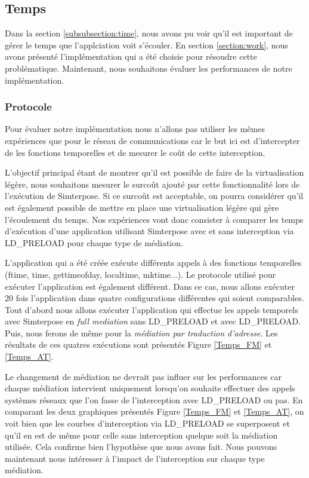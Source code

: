 \subsection{Temps}
\label{section:temps}
Dans la section \ref{subsubsection:time}, nous avons pu voir qu'il est important de gérer le temps que l'applciation voit s'écouler. En section \ref{section:work}, nous avons présenté l'implémentation qui a été choisie pour résoudre cette problématique. Maintenant, nous souhaitons évaluer les performances de notre implémentation.

\subsubsection{Protocole}
Pour évaluer notre implémentation nous n'allons pas utiliser les mêmes expériences que pour le réseau de communications car le but ici est d'intercepter de les fonctions temporelles et de mesurer le coût de cette interception.

L'objectif principal étant de montrer qu'il est possible de faire de la virtualisation légère, nous souhaitons mesurer le surcoût ajouté par cette fonctionnalité lors de l'exécution de Simterpose. Si ce surcoût est acceptable, on pourra considérer qu'il est également possible de mettre en place une virtualisation légère qui gère l'écoulement du temps. Nos expériences vont donc consister à comparer les temps d'exécution d'une application utilisant Simterpose avec et sans interception via LD\_PRELOAD pour chaque type de médiation.

L'application qui a été créée exécute différents appels à des fonctions temporelles (ftime, time, gettimeofday, localtime, mktime...). Le protocole utilisé pour exécuter l'application est également différent. Dans ce cas, nous allons exécuter 20 fois l'application dans quatre configurations différentes qui soient comparables. Tout d'abord nous allons exécuter l'application qui effectue les appels temporels avec Simterpose en \textit{full mediation} sans LD\_PRELOAD et avec LD\_PRELOAD. Puis, nous ferons de même pour la \textit{médiation par traduction d'adresse}. Les résultats de ces quatres exécutions sont présentés Figure \ref{Temps_FM} et \ref{Temps_AT}.

Le changement de médiation ne devrait pas influer sur les performances car chaque médiation intervient uniquement lorsqu'on souhaite effectuer des appels systèmes réseaux que l'on fasse de l'interception avec LD\_PRELOAD ou pas. En comparant les deux graphiques présentés Figure \ref{Temps_FM} et \ref{Temps_AT}, on voit bien que les courbes d'interception via LD\_PRELOAD se superposent et qu'il en est de même pour celle sans interception quelque soit la médiation utilisée. Cela confirme bien l'hypothèse que nous avons fait. Nous pouvons maintenant nous intéresser à l'impact de l'interception sur chaque type médiation.

